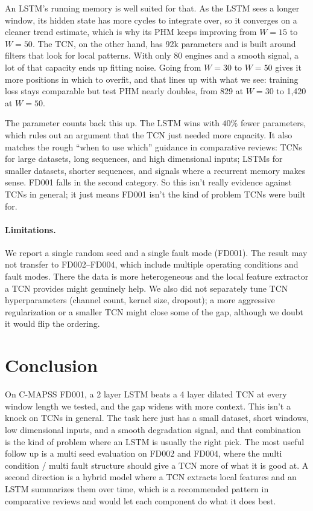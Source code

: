 \documentclass{article}
\begin{document}
An LSTM's running memory is well suited for that. As the LSTM sees a longer window, its hidden state has more cycles to integrate over, so it converges on a cleaner trend estimate, which is why its PHM keeps improving from $W{=}15$ to $W{=}50$. The TCN, on the other hand, has 92k parameters and is built around filters that look for local patterns. With only 80 engines and a smooth signal, a lot of that capacity ends up fitting noise. Going from $W{=}30$ to $W{=}50$ gives it more positions in which to overfit, and that lines up with what we see: training loss stays comparable but test PHM nearly doubles, from 829 at $W{=}30$ to 1{,}420 at $W{=}50$.

The parameter counts back this up. The LSTM wins with $40\%$ fewer parameters, which rules out an argument that the TCN just needed more capacity. It also matches the rough ``when to use which'' guidance in comparative reviews: TCNs for large datasets, long sequences, and high dimensional inputs; LSTMs for smaller datasets, shorter sequences, and signals where a recurrent memory makes sense. FD001 falls in the second category. So this isn't really evidence against TCNs in general; it just means FD001 isn't the kind of problem TCNs were built for.

\paragraph{Limitations.} We report a single random seed and a single fault mode (FD001). The result may not transfer to FD002--FD004, which include multiple operating conditions and fault modes. There the data is more heterogeneous and the local feature extractor a TCN provides might genuinely help. We also did not separately tune TCN hyperparameters (channel count, kernel size, dropout); a more aggressive regularization or a smaller TCN might close some of the gap, although we doubt it would flip the ordering.


\section{Conclusion}

On C-MAPSS FD001, a 2 layer LSTM beats a 4 layer dilated TCN at every window length we tested, and the gap widens with more context. This isn't a knock on TCNs in general. The task here just has a small dataset, short windows, low dimensional inputs, and a smooth degradation signal, and that combination is the kind of problem where an LSTM is usually the right pick. The most useful follow up is a multi seed evaluation on FD002 and FD004, where the multi condition / multi fault structure should give a TCN more of what it is good at. A second direction is a hybrid model where a TCN extracts local features and an LSTM summarizes them over time, which is a recommended pattern in comparative reviews and would let each component do what it does best.
\end{document}
